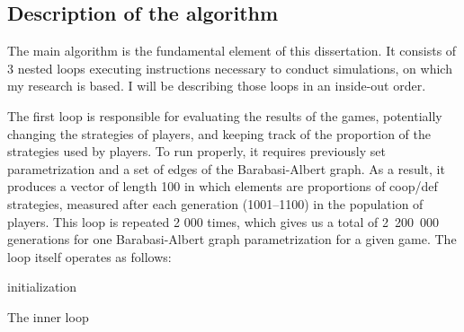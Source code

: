 \documentclass[english, twoside, 12pt, a4paper]{article}
\theoremstyle{definition}
\theoremstyle{plain}
\theoremstyle{remark}
\begin{document}
\subsection{Description of the algorithm}

The main algorithm is the fundamental element of this dissertation. It consists of 3 nested loops executing instructions necessary to conduct simulations, on which my research is based. I will be describing those loops in an inside-out order. 

The first loop is responsible for evaluating the results of the games, potentially changing the strategies of players, and keeping track of the proportion of the strategies used by players. To run properly, it requires previously set parametrization and a set of edges of the Barabasi-Albert graph. As a result, it produces a vector of length 100 in which elements are proportions of coop/def strategies, measured after each generation (1001--1100) in the population of players. This loop is repeated 2 000 times, which gives us a total of 2~200~000 generations for one Barabasi-Albert graph parametrization for a given game.
The loop itself operates as follows:


\begin{algorithm}[H]
  initialization\;
\caption{The inner loop}
\end{algorithm}
 
\end{document}
